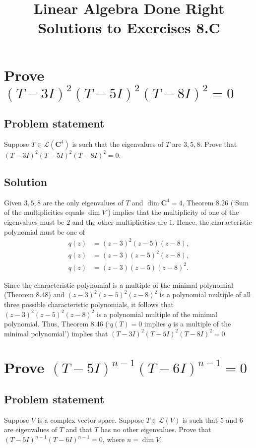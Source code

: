 \documentclass{article}
\title{Linear Algebra Done Right\\Solutions to Exercises 8.C}
\author{}
\date{}
\begin{document}
\maketitle

\section{Prove $(T-3I)^2(T-5I)^2(T-8I)^2=0$}
\subsection*{Problem statement}
Suppose $T\in\mathcal{L}(\mathbf{C}^4)$ is such that the eigenvalues of $T$ are $3,5,8$. 
Prove that $(T-3I)^2(T-5I)^2(T-8I)^2=0$.

\subsection*{Solution}
Given $3,5,8$ are the only eigenvalues of $T$ and $\operatorname{dim}\mathbf{C}^4=4$, Theorem 8.26 (`Sum of the multiplicities equals $\operatorname{dim}V$') implies that the multiplicity of one of the eigenvalues must be $2$ and the other multiplicities are $1$. 
Hence, the characteristic polynomial must be one of
\begin{align*}
    q(z)&=(z-3)^2(z-5)(z-8),\\
    q(z)&=(z-3)(z-5)^2(z-8),\\
    q(z)&=(z-3)(z-5)(z-8)^2.
\end{align*}

Since the characteristic polynomial is a multiple of the minimal polynomial (Theorem 8.48) and $(z-3)^2(z-5)^2(z-8)^2$ is a polynomial multiple of all three possible characteristic polynomials, it follows that 
\newline
$(z-3)^2(z-5)^2(z-8)^2$ is a polynomial multiple of the minimal polynomial. 
Thus, Theorem 8.46 (`$q(T)=0$ implies $q$ is a multiple of the minimal polynomial') implies that $(T-3I)^2(T-5I)^2(T-8I)^2=0$.

\clearpage

\section{Prove $(T-5I)^{n-1}(T-6I)^{n-1}=0$}
\subsection*{Problem statement}
Suppose $V$ is a complex vector space. 
Suppose $T\in\mathcal{L}(V)$ is such that $5$ and $6$ are eigenvalues of $T$ and that $T$ has no other eigenvalues. 
Prove that 
\newline
$(T-5I)^{n-1}(T-6I)^{n-1}=0$, where $n=\operatorname{dim}V$.
\end{document}

